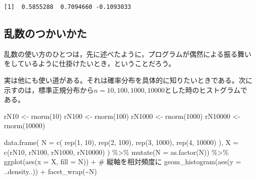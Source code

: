 \documentclass[
  a4paper,
]{ltjsbook}
\newenvironment{Shaded}{\begin{snugshade}}{\end{snugshade}}
\newcommand{\AttributeTok}[1]{\textcolor[rgb]{0.40,0.45,0.13}{#1}}
\newcommand{\CommentTok}[1]{\textcolor[rgb]{0.37,0.37,0.37}{#1}}
\newcommand{\DecValTok}[1]{\textcolor[rgb]{0.68,0.00,0.00}{#1}}
\newcommand{\FunctionTok}[1]{\textcolor[rgb]{0.28,0.35,0.67}{#1}}
\newcommand{\NormalTok}[1]{\textcolor[rgb]{0.00,0.23,0.31}{#1}}
\newcommand{\OtherTok}[1]{\textcolor[rgb]{0.00,0.23,0.31}{#1}}
\newcommand{\SpecialCharTok}[1]{\textcolor[rgb]{0.37,0.37,0.37}{#1}}
\begin{document}
\begin{verbatim}
[1]  0.5855288  0.7094660 -0.1093033
\end{verbatim}

\subsection{乱数のつかいかた}\label{ux4e71ux6570ux306eux3064ux304bux3044ux304bux305f}

乱数の使い方のひとつは，先に述べたように，プログラムが偶然による振る舞いをしているように仕掛けたいとき，ということだろう。

実は他にも使い道がある。それは確率分布を具体的に知りたいときである。次に示すのは，標準正規分布から\(n = 10,100,1000,10000\)とした時のヒストグラムである。

\begin{Shaded}
\begin{Highlighting}[]
\NormalTok{rN10 }\OtherTok{\textless{}{-}} \FunctionTok{rnorm}\NormalTok{(}\DecValTok{10}\NormalTok{)}
\NormalTok{rN100 }\OtherTok{\textless{}{-}} \FunctionTok{rnorm}\NormalTok{(}\DecValTok{100}\NormalTok{)}
\NormalTok{rN1000 }\OtherTok{\textless{}{-}} \FunctionTok{rnorm}\NormalTok{(}\DecValTok{1000}\NormalTok{)}
\NormalTok{rN10000 }\OtherTok{\textless{}{-}} \FunctionTok{rnorm}\NormalTok{(}\DecValTok{10000}\NormalTok{)}

\FunctionTok{data.frame}\NormalTok{(}
  \AttributeTok{N =} \FunctionTok{c}\NormalTok{(}
    \FunctionTok{rep}\NormalTok{(}\DecValTok{1}\NormalTok{, }\DecValTok{10}\NormalTok{), }\FunctionTok{rep}\NormalTok{(}\DecValTok{2}\NormalTok{, }\DecValTok{100}\NormalTok{),}
    \FunctionTok{rep}\NormalTok{(}\DecValTok{3}\NormalTok{, }\DecValTok{1000}\NormalTok{), }\FunctionTok{rep}\NormalTok{(}\DecValTok{4}\NormalTok{, }\DecValTok{10000}\NormalTok{)}
\NormalTok{  ),}
  \AttributeTok{X =} \FunctionTok{c}\NormalTok{(rN10, rN100, rN1000, rN10000)}
\NormalTok{) }\SpecialCharTok{\%\textgreater{}\%}
  \FunctionTok{mutate}\NormalTok{(}\AttributeTok{N =} \FunctionTok{as.factor}\NormalTok{(N)) }\SpecialCharTok{\%\textgreater{}\%}
  \FunctionTok{ggplot}\NormalTok{(}\FunctionTok{aes}\NormalTok{(}\AttributeTok{x =}\NormalTok{ X, }\AttributeTok{fill =}\NormalTok{ N)) }\SpecialCharTok{+}
  \CommentTok{\# 縦軸を相対頻度に}
  \FunctionTok{geom\_histogram}\NormalTok{(}\FunctionTok{aes}\NormalTok{(}\AttributeTok{y =}\NormalTok{ ..density..)) }\SpecialCharTok{+}
  \FunctionTok{facet\_wrap}\NormalTok{(}\SpecialCharTok{\textasciitilde{}}\NormalTok{N)}
\end{Highlighting}
\end{Shaded}
\end{document}
